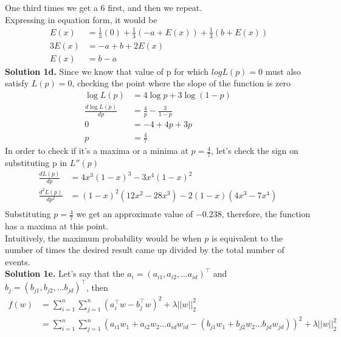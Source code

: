 \documentclass[11pt]{article}
\begin{document}
One third times we get a 6 first, and then we repeat. \\
\linebreak
Expressing in equation form, it would be \\
\begin{equation*}\
\begin{split}
E(x) & = \frac{1}{3}(0) + \frac{1}{3}(-a + E(x)) + \frac{1}{3}(b + E(x)) \\
3 E(x) & = -a + b + 2E(x) \\
E(x) & = b-a
\end{split}
\end{equation*}
\linebreak
\textbf{Solution 1d.} Since we know that value of p for which $log L(p) = 0$ must also satisfy $L(p) = 0$, checking the point where the slope of the function is zero  \\
\begin{equation*}
\begin{split}
\log L(p) & = 4\log p + 3\log (1-p)\\
\frac{d \log L(p)}{d p} & = \frac{4}{p} - \frac{3}{1-p}\\
0 & = - 4 + 4p + 3p\\
p & = \frac{4}{7}
\end{split}
\end{equation*}
In order to check if it's a maxima or a minima at $ p = \frac{4}{7}$, let's check the sign on substituting p in $L''(p)$ \\
\begin{equation*}
\begin{split}
\frac{d L(p)}{d p} & = 4x^3(1-x)^3 - 3x^4(1-x)^2 \\
\frac{d^2 L(p)}{d p^2} & = (1-x)^2(12x^2 - 28x^3) - 2(1-x)(4x^3 - 7x^4) \\
\end{split}
\end{equation*}
Substituting $p= \frac{4}{7}$ we get an approximate value of $-0.238$, therefore, the function has a maxima at this point.\\
Intuitively, the maximum probability would be when $p$ is equivalent to the number of times the desired result came up divided by the total number of events. \\
\linebreak
\textbf{Solution 1e.} Let's say that the $a_i = (a_{i1}, a_{i2}, \dots a_{id})^\top$ and $b_j = (b_{j1}, b_{j2}, \dots b_{jd})^\top$, then
\begin{align*}
f(w) & = \sum_{i=1}^{n}\sum_{j=1}^{n} (a_i^\top w - b_j^\top w)^2 + \lambda||w||_2^2 \\
& = \sum_{i=1}^{n}\sum_{j=1}^{n} (a_{i1}w_1 + a_{i2}w_2 \dots a_{id}w_{id} - (b_{j1}w_1 + b_{j2}w_2 \dots b_{jd}w_{jd}))^2 + \lambda||w||_2^2
\end{align*}
\end{document}
